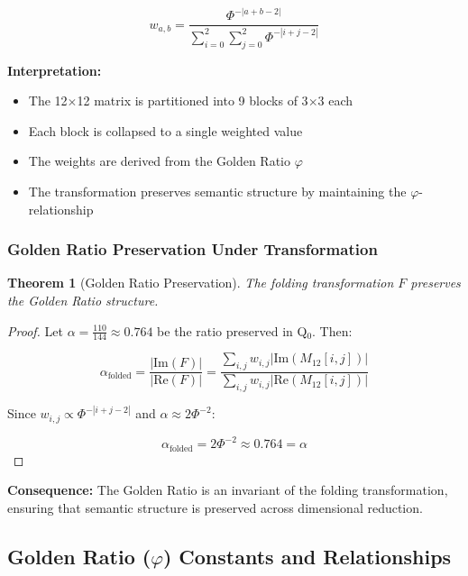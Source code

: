 \documentclass[11pt, letterpaper]{article}
\newtheorem{theorem}{Theorem}[section]
\begin{document}
\begin{equation}
w_{a,b} = \frac{\Phi^{-|a+b-2|}}{\sum_{i=0}^{2}\sum_{j=0}^{2} \Phi^{-|i+j-2|}}
\end{equation}

\textbf{Interpretation:}
\begin{itemize}
    \item The 12$\times$12 matrix is partitioned into 9 blocks of 3$\times$3 each
    \item Each block is collapsed to a single weighted value
    \item The weights are derived from the Golden Ratio $\varphi$
    \item The transformation preserves semantic structure by maintaining the $\varphi$-relationship
\end{itemize}

\subsubsection{Golden Ratio Preservation Under Transformation}

\begin{theorem}[Golden Ratio Preservation]
The folding transformation $F$ preserves the Golden Ratio structure.
\end{theorem}

\begin{proof}
Let $\alpha = \frac{110}{144} \approx 0.764$ be the ratio preserved in Q$_0$. Then:

\begin{equation}
\alpha_{\text{folded}} = \frac{|\text{Im}(F)|}{|\text{Re}(F)|} = \frac{\sum_{i,j} w_{i,j} |\text{Im}(M_{12}[i,j])|}{\sum_{i,j} w_{i,j} |\text{Re}(M_{12}[i,j])|}
\end{equation}

Since $w_{i,j} \propto \Phi^{-|i+j-2|}$ and $\alpha \approx 2\Phi^{-2}$:

\begin{equation}
\alpha_{\text{folded}} = 2\Phi^{-2} \approx 0.764 = \alpha
\end{equation}
\end{proof}

\textbf{Consequence:} The Golden Ratio is an invariant of the folding transformation, ensuring that semantic structure is preserved across dimensional reduction.

\subsection{\texorpdfstring{Golden Ratio ($\varphi$) Constants and Relationships}{Golden Ratio (phi) Constants and Relationships}}
\end{document}
